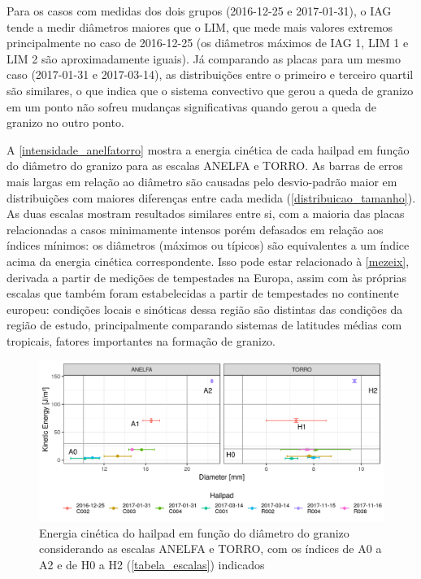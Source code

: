 Para os casos com medidas dos dois grupos (2016-12-25 e 2017-01-31), o IAG tende a medir diâmetros maiores que o LIM, que mede mais valores extremos principalmente no caso de 2016-12-25 (os diâmetros máximos de IAG 1, LIM 1 e LIM 2 são aproximadamente iguais). Já comparando as placas para um mesmo caso (2017-01-31 e 2017-03-14), as distribuições entre o primeiro e terceiro quartil são similares, o que indica que o sistema convectivo que gerou a queda de granizo em um ponto não sofreu mudanças significativas quando gerou a queda de granizo no outro ponto. 

A \autoref{intensidade_anelfatorro} mostra a energia cinética de cada hailpad em função do diâmetro do granizo para as escalas ANELFA e TORRO. As barras de erros mais largas em relação ao diâmetro são causadas pelo desvio-padrão maior em distribuições com maiores diferenças entre cada medida (\autoref{distribuicao_tamanho}). As duas escalas mostram resultados similares entre si, com a maioria das placas relacionadas a casos minimamente intensos porém defasados em relação aos índices mínimos: os diâmetros (máximos ou típicos) são equivalentes a um índice acima da energia cinética correspondente. Isso pode estar relacionado à \autoref{mezeix}, derivada a partir de medições de tempestades na Europa, assim com às próprias escalas que também foram estabelecidas a partir de tempestades no continente europeu: condições locais e sinóticas dessa região são distintas das condições da região de estudo, principalmente comparando sistemas de latitudes médias com tropicais, fatores importantes na formação de granizo.

\begin{figure}[hbt]
	\begin{center}
		\caption{Energia cinética do hailpad em função do diâmetro do granizo considerando as escalas ANELFA e TORRO, com os índices de A0 a A2 e de H0 a H2 (\autoref{tabela_escalas}) indicados} 
		\label{intensidade_anelfatorro}
		\includegraphics[width=\columnwidth]{../Hailpads_Processing/figures/data_anelfa_torro.png}
	\end{center}
\end{figure}

